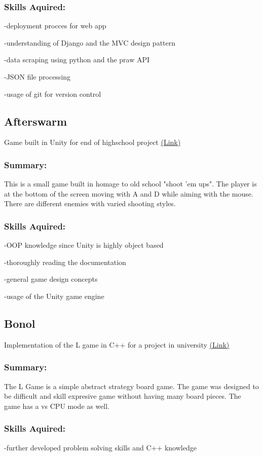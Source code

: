 \documentclass[a4paper,hidelinks,10pt]{article}
\begin{document}
\subsubsection{Skills Aquired:}

-deployment procces for web app

-understanding of Django and the MVC design pattern

-data scraping using python and the praw API

-JSON file processing

-usage of git for version control

\subsection{Afterswarm}
Game built in Unity for end of highschool project \href{https://mega.nz/#F!e7hGCa6A!YFMBrU9kS6GqHZPJJb20WA}{(Link)}
\subsubsection{Summary:}
This is a small game built in homage to old school "shoot 'em ups". The player is at the bottom of the screen
moving with A and D while aiming with the mouse. There are different enemies with varied shooting styles.

\subsubsection{Skills Aquired:}
-OOP knowledge since Unity is highly object based

-thoroughly reading the documentation

-general game design concepts

-usage of the Unity game engine

\subsection{Bonol}
Implementation of the L game in C++ for a project in university \href{https://github.com/IureaMarius/ProiectIP}{(Link)}
\subsubsection{Summary:}
The L Game is a simple abstract strategy board game. The game was designed to be difficult and skill expresive
game without having many board pieces. The game has a vs CPU mode as well.
\subsubsection{Skills Aquired:}
-further developed problem solving skills and C++ knowledge
\end{document}
